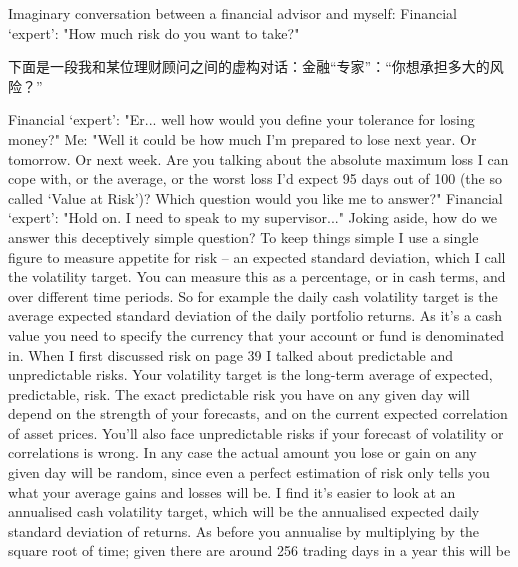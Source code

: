 
\begin{englishblock} Imaginary conversation between a financial advisor and myself: Financial ‘expert': "How much risk do you want to take?" \end{englishblock}

\begin{chineseblock}下面是一段我和某位理财顾问之间的虚构对话：金融“专家”：“你想承担多大的风险？”\end{chineseblock}


\begin{englishblock} Financial ‘expert': "Er... well how would you define your tolerance for losing money?" Me: "Well it could be how much I'm prepared to lose next year. Or tomorrow. Or next week. Are you talking about the absolute maximum loss I can cope with, or the average, or the worst loss I'd expect 95 days out of 100 (the so called ‘Value at Risk')? Which question would you like me to answer?" Financial ‘expert': "Hold on. I need to speak to my supervisor..." Joking aside, how do we answer this deceptively simple question? To keep things simple I use a single figure to measure appetite for risk -- an expected standard deviation, which I call the volatility target. You can measure this as a percentage, or in cash terms, and over different time periods. So for example the daily cash volatility target is the average expected standard deviation of the daily portfolio returns. As it's a cash value you need to specify the currency that your account or fund is denominated in. When I first discussed risk on page 39 I talked about predictable and unpredictable risks. Your volatility target is the long-term average of expected, predictable, risk. The exact predictable risk you have on any given day will depend on the strength of your forecasts, and on the current expected correlation of asset prices. You'll also face unpredictable risks if your forecast of volatility or correlations is wrong. In any case the actual amount you lose or gain on any given day will be random, since even a perfect estimation of risk only tells you what your average gains and losses will be. I find it's easier to look at an annualised cash volatility target, which will be the annualised expected daily standard deviation of returns. As before you annualise by multiplying by the square root of time; given there are around 256 trading days in a year this will be \end{englishblock}

